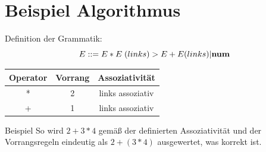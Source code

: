 \documentclass[t]{beamer}
\renewcommand{\Coloneqq}{\mathrel{\mathop{::}}=}
\begin{document}
    \section{Beispiel Algorithmus}\label{sec:beispiel-algorithmus}
    \begin{frame}
        \centering
        \begin{block}{Definition der Grammatik:}
            \centering
            \[E \Coloneqq E * E \phantom{|} (links) > E + E (links) | \bold{num} \]
            \bigskip
            \begin{tabular}{|c|c|c|}
                \hline
                Operator & Vorrang & Assoziativität   \\
                \hline
                *        & 2       & links assoziativ \\
                \hline
                +        & 1       & links assoziativ \\
                \hline
            \end{tabular}\label{tab:table4}
        \end{block}
        \bigskip\bigskip
        \begin{exampleblock}{Beispiel}
            So wird $2 + 3 * 4$ gemäß der definierten Assoziativität und der Vorrangsregeln eindeutig als
            $2 + (3 * 4)$ ausgewertet, was korrekt ist.
        \end{exampleblock}
    \end{frame}
\end{document}
